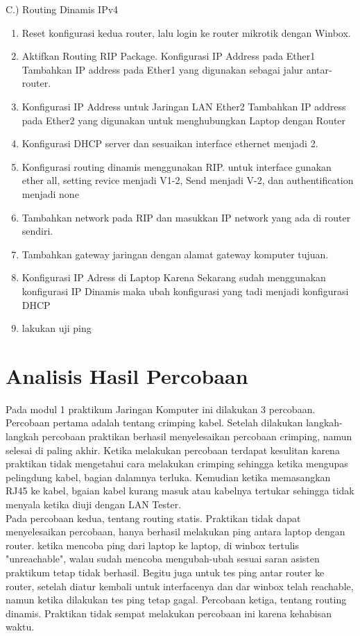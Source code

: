 C.) Routing Dinamis IPv4
\begin{enumerate}
	\item Reset konfigurasi kedua router, lalu login ke router mikrotik dengan Winbox.
	\item  Aktifkan Routing RIP Package. Konfigurasi IP Address pada Ether1 Tambahkan IP address pada Ether1 yang digunakan sebagai jalur antar-router. 
	\item  Konfigurasi IP Address untuk Jaringan LAN Ether2 Tambahkan IP address pada Ether2 yang digunakan untuk menghubungkan Laptop dengan Router
	\item  Konfigurasi DHCP server dan sesuaikan interface ethernet menjadi 2.
	\item Konfigurasi routing dinamis menggunakan RIP. untuk interface gunakan ether all, setting revice menjadi V1-2, Send menjadi V-2, dan authentification menjadi none
	\item Tambahkan network pada RIP dan masukkan IP network yang ada di router sendiri.
	\item Tambahkan gateway jaringan dengan alamat gateway komputer tujuan.
	\item Konfigurasi IP Adress di Laptop Karena Sekarang sudah menggunakan konfigurasi IP Dinamis maka ubah konfigurasi yang tadi menjadi konfigurasi DHCP
	\item lakukan uji ping
\end{enumerate}

\section{Analisis Hasil Percobaan}
Pada modul 1 praktikum Jaringan Komputer ini dilakukan 3 percobaan. Percobaan pertama adalah tentang crimping kabel. Setelah dilakukan langkah-langkah percobaan praktikan berhasil menyelesaikan percobaan crimping, namun selesai di paling akhir. Ketika melakukan percobaan terdapat kesulitan karena praktikan tidak mengetahui cara melakukan crimping sehingga ketika mengupas pelingdung kabel, bagian dalamnya terluka. Kemudian ketika memasangkan RJ45 ke kabel, bgaian kabel kurang masuk atau kabelnya tertukar sehingga tidak menyala ketika diuji dengan LAN Tester.\\
Pada percobaan kedua, tentang routing statis. Praktikan tidak dapat menyelesaikan percobaan, hanya berhasil melakukan ping antara laptop dengan router. ketika mencoba ping dari laptop ke laptop, di winbox tertulis "unreachable", walau sudah mencoba mengubah-ubah sesuai saran asisten praktikum tetap tidak berhasil. Begitu juga untuk tes ping antar router ke router, setelah diatur kembali untuk interfacenya dan dar winbox telah reachable, namun ketika dilakukan tes ping tetap gagal. Percobaan ketiga, tentang routing dinamis. Praktikan tidak sempat melakukan percobaan ini karena kehabisan waktu.

